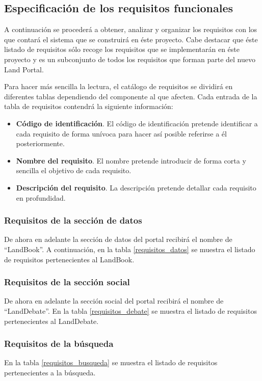 \subsection{Especificación de los requisitos funcionales}
A continuación se procederá a obtener, analizar y organizar los requisitos con los que contará el sistema que se construirá en éste proyecto.  Cabe destacar que éste listado de requisitos sólo recoge los requisitos que se implementarán en éste proyecto y es un subconjunto de todos los requisitos que forman parte del nuevo Land Portal.

Para hacer más sencilla la lectura, el catálogo de requisitos se dividirá en diferentes tablas dependiendo del componente al que afecten.
Cada entrada de la tabla de requisitos contendrá la siguiente información:
\begin{itemize}
\item \textbf{Código de identificación}. El código de identificación pretende identificar a cada requisito de forma unívoca para hacer así posible referirse a él posteriormente.
\item \textbf{Nombre del requisito}. El nombre pretende introducir de forma corta y sencilla el objetivo de cada requisito.
\item \textbf{Descripción del requisito}. La descripción pretende detallar cada requisito en profundidad.
\end{itemize}

\subsubsection{Requisitos de la sección de datos}
\label{requisitos_seccion_datos}
De ahora en adelante la sección de datos del portal recibirá el nombre de ``LandBook''.  A continuación, en la tabla  \ref{requisitos_datos} se muestra el listado de requisitos pertenecientes al LandBook.


\subsubsection{Requisitos de la sección social}
\label{requisitos_seccion_social}
De ahora en adelante la sección social del portal recibirá el nombre de ``LandDebate''.  En la tabla \ref{requisitos_debate} se muestra el listado de requisitos pertenecientes al LandDebate.


\subsubsection{Requisitos de la búsqueda}
En la tabla \ref{requisitos_busqueda} se muestra el listado de requisitos pertenecientes a la búsqueda.


